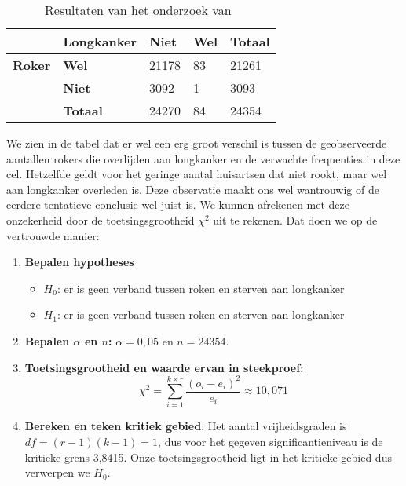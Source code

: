 \begin{table}
  \begin{center}
    \begin{tabular}{@{}lllll@{}}
    	\toprule
    	               & \textbf{Longkanker} & \textbf{Niet} & \textbf{Wel} & \textbf{Totaal} \\
    	\midrule
    	\textbf{Roker} & \textbf{Wel}        & 21178         & 83           & 21261           \\
    	               & \textbf{Niet}       & 3092          & 1            & 3093            \\
    	               & \textbf{Totaal}     & 24270         & 84           & 24354           \\
    	\bottomrule
    \end{tabular}
  \end{center}
  \caption{Resultaten van het onderzoek van~\textcite{Doll1954}}
  \label{tab:dollhill}
\end{table}

We zien in de tabel dat er wel een erg groot verschil is tussen de geobserveerde aantallen rokers die overlijden aan longkanker en de verwachte frequenties in deze cel. Hetzelfde geldt voor het geringe aantal huisartsen dat niet rookt, maar wel aan longkanker overleden is. Deze observatie maakt ons wel wantrouwig of de eerdere tentatieve conclusie wel juist is. We kunnen afrekenen met deze onzekerheid door de toetsingsgrootheid $\chi^{2}$ uit te rekenen. Dat doen we op de vertrouwde manier:

\begin{enumerate}
  \item \textbf{Bepalen hypotheses}
  \begin{itemize}
    \item $H_{0}$: er is geen verband tussen roken en sterven aan longkanker
    \item $H_{1}$: er is geen verband tussen roken en sterven aan longkanker
  \end{itemize}
  \item \textbf{Bepalen $\alpha$ en $n$:} $\alpha = 0,05$ en $n = 24354$.
  \item \textbf{Toetsingsgrootheid en waarde ervan in steekproef}:
  \[ \chi^{2} = \sum_{i=1}^{k \times r} \frac{(o_{i} - e_{i})^{2}}{e_{i}} \approx 10,071 \]
  \item \textbf{Bereken en teken kritiek gebied}: Het aantal vrijheidsgraden is $df = (r-1)(k-1) = 1$, dus voor het gegeven significantieniveau is de kritieke grens 3,8415. Onze toetsingsgrootheid ligt in het kritieke gebied dus verwerpen we $H_{0}$.
\end{enumerate}

